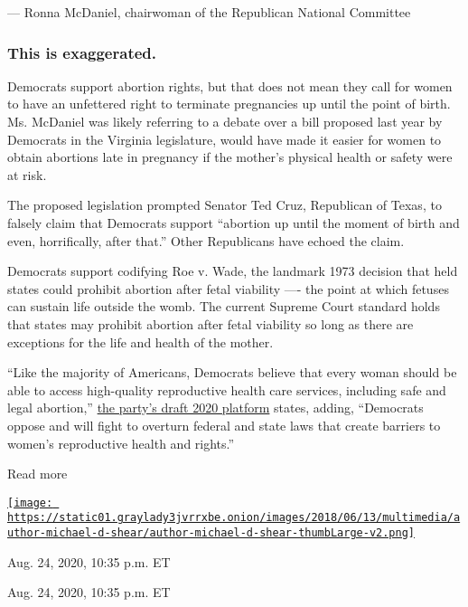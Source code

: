--- Ronna McDaniel, chairwoman of the Republican National Committee

\hypertarget{this-is-exaggerated--1}{%
\subsubsection{\texorpdfstring{\textbf{This is exaggerated.}
}{This is exaggerated. }}\label{this-is-exaggerated--1}}

Democrats support abortion rights, but that does not mean they call for
women to have an unfettered right to terminate pregnancies up until the
point of birth. Ms. McDaniel was likely referring to a debate over a
bill proposed last year by Democrats in the Virginia legislature, would
have made it easier for women to obtain abortions late in pregnancy if
the mother's physical health or safety were at risk.

The proposed legislation prompted Senator Ted Cruz, Republican of Texas,
to falsely claim that Democrats support ``abortion up until the moment
of birth and even, horrifically, after that.'' Other Republicans have
echoed the claim.

Democrats support codifying Roe v. Wade, the landmark 1973 decision that
held states could prohibit abortion after fetal viability ---- the point
at which fetuses can sustain life outside the womb. The current Supreme
Court standard holds that states may prohibit abortion after fetal
viability so long as there are exceptions for the life and health of the
mother.

``Like the majority of Americans, Democrats believe that every woman
should be able to access high-quality reproductive health care services,
including safe and legal abortion,''
\href{https://slack-redir.net/link?url=https\%3A\%2F\%2Fwww.demconvention.com\%2Fwp-content\%2Fuploads\%2F2020\%2F07\%2F2020-07-21-DRAFT-Democratic-Party-Platform.pdf}{the
party's draft 2020 platform} states, adding, ``Democrats oppose and will
fight to overturn federal and state laws that create barriers to women's
reproductive health and rights.''

Read more

\href{https://www.nytimes3xbfgragh.onion/by/michael-d-shear}{\texttt{[image: https://static01.graylady3jvrrxbe.onion/images/2018/06/13/multimedia/author-michael-d-shear/author-michael-d-shear-thumbLarge-v2.png]}}

Aug. 24, 2020, 10:35 p.m. ET

Aug. 24, 2020, 10:35 p.m. ET

